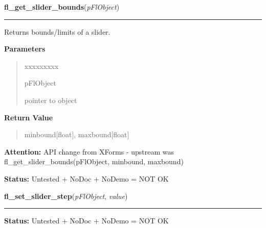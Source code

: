 \hspace{.8\funcindent}\begin{boxedminipage}{\funcwidth}

    \raggedright \textbf{fl\_get\_slider\_bounds}(\textit{pFlObject})

    \vspace{-1.5ex}

    \rule{\textwidth}{0.5\fboxrule}
\setlength{\parskip}{2ex}
    Returns bounds/limits of a slider.

\setlength{\parskip}{1ex}
      \textbf{Parameters}
      \vspace{-1ex}

      \begin{quote}
        \begin{Ventry}{xxxxxxxxx}

          \item[pFlObject]

          pointer to object

        \end{Ventry}

      \end{quote}

      \textbf{Return Value}
    \vspace{-1ex}

      \begin{quote}
      minbound[float], maxbound[float]

      \end{quote}

\textbf{Attention:} API change from XForms - upstream was fl\_get\_slider\_bounds(pFlObject, 
minbound, maxbound)



\textbf{Status:} Untested + NoDoc + NoDemo = NOT OK



    \end{boxedminipage}

    \label{xformslib:flslider:fl_set_slider_step}

    \vspace{0.5ex}

\hspace{.8\funcindent}\begin{boxedminipage}{\funcwidth}

    \raggedright \textbf{fl\_set\_slider\_step}(\textit{pFlObject}, \textit{value})

    \vspace{-1.5ex}

    \rule{\textwidth}{0.5\fboxrule}
\setlength{\parskip}{2ex}
\setlength{\parskip}{1ex}
\textbf{Status:} Untested + NoDoc + NoDemo = NOT OK



    \end{boxedminipage}

